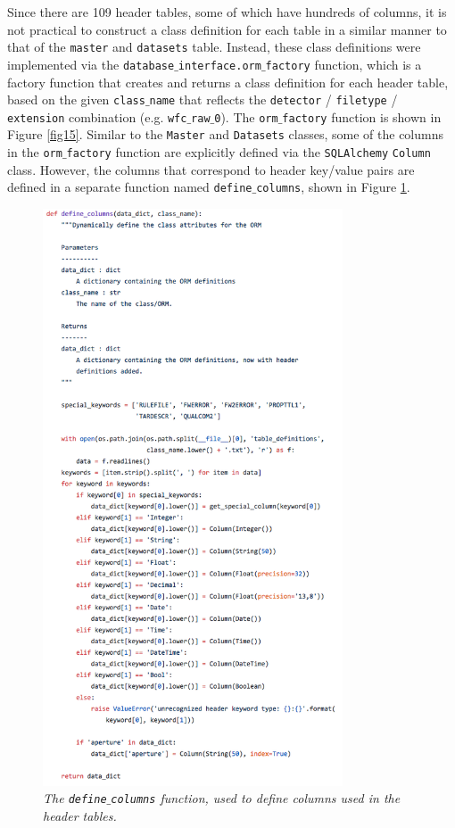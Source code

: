 \documentclass[10pt,journal,compsoc]{IEEEtran}
\begin{document}
Since there are 109 header tables, some of which have hundreds of columns, it is not practical to construct a class definition for each table in a similar manner to that of the
\texttt{master} and \texttt{datasets} table.  Instead, these class definitions were implemented via the \texttt{database$\_$interface.orm$\_$factory} function, which is a factory
function that creates and returns a class definition for each header table, based on the given \texttt{class$\_$name} that reflects the
\texttt{detector} / \texttt{filetype} / \texttt{extension} combination (e.g. \texttt{wfc$\_$raw$\_$0}).  The \texttt{orm$\_$factory} function is shown in Figure \ref{fig15}.  Similar to the
\texttt{Master} and \texttt{Datasets} classes, some of the columns in the \texttt{orm$\_$factory} function are explicitly defined via the \texttt{SQLAlchemy} \texttt{Column} class.
However, the columns that correspond to header key/value pairs are defined in a separate function named \texttt{define$\_$columns}, shown in Figure \ref{fig16}.

\begin{figure}[!h]
\centering
\includegraphics[width=3.5in]{./figures/define_columns.png}
\caption{\textit{The \texttt{define$\_$columns} function, used to define columns used in the header tables.}}
\label{fig16}
\end{figure}
\end{document}
